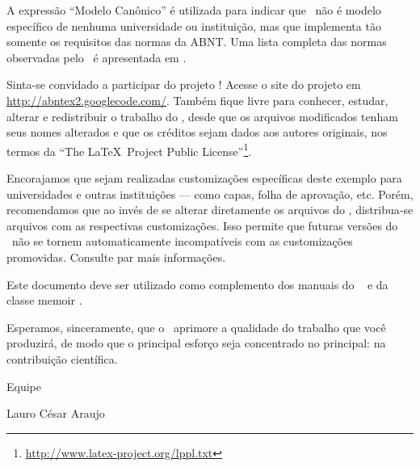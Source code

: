 A expressão ``Modelo Canônico'' é utilizada para indicar que \abnTeX\ não é
modelo específico de nenhuma universidade ou instituição, mas que implementa tão
somente os requisitos das normas da ABNT. Uma lista completa das normas
observadas pelo \abnTeX\ é apresentada em .

Sinta-se convidado a participar do projeto \abnTeX! Acesse o site do projeto em
\url{http://abntex2.googlecode.com/}. Também fique livre para conhecer,
estudar, alterar e redistribuir o trabalho do \abnTeX, desde que os arquivos
modificados tenham seus nomes alterados e que os créditos sejam dados aos
autores originais, nos termos da ``The \LaTeX\ Project Public
License''\footnote{\url{http://www.latex-project.org/lppl.txt}}.

Encorajamos que sejam realizadas customizações específicas deste exemplo para
universidades e outras instituições --- como capas, folha de aprovação, etc.
Porém, recomendamos que ao invés de se alterar diretamente os arquivos do
\abnTeX, distribua-se arquivos com as respectivas customizações.
Isso permite que futuras versões do \abnTeX~não se tornem automaticamente
incompatíveis com as customizações promovidas. Consulte
 par mais informações.

Este documento deve ser utilizado como complemento dos manuais do \abnTeX\
\cite{abntex2classe,abntex2cite,abntex2cite-alf} e da classe \textsf{memoir}
\cite{memoir}.

Esperamos, sinceramente, que o \abnTeX\ aprimore a qualidade do trabalho que
você produzirá, de modo que o principal esforço seja concentrado no principal:
na contribuição científica.

Equipe \abnTeX

Lauro César Araujo


